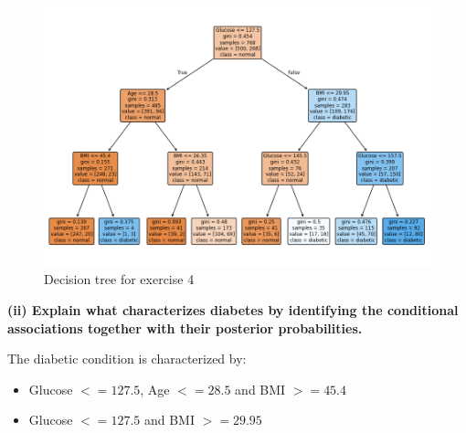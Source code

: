 \documentclass[12pt]{article}
\begin{document}
\begin{enumerate}[leftmargin=\labelsep,resume]
    \begin{figure}[H]
        \centering
          \includegraphics[width=15cm]{./Part II/4.png}
          \caption{Decision tree for exercise 4}
    \end{figure}

\vspace{2cm}

\textbf{(ii) Explain what characterizes diabetes by identifying the conditional associations
together with their posterior probabilities.}

\vspace{0.5cm}

The diabetic condition is characterized by:

\begin{itemize}
    \item Glucose $<= 127.5$, Age $<= 28.5$ and BMI $>= 45.4$
    \item Glucose $<= 127.5$ and BMI $>= 29.95$
\end{itemize}

\end{enumerate}
\end{document}
